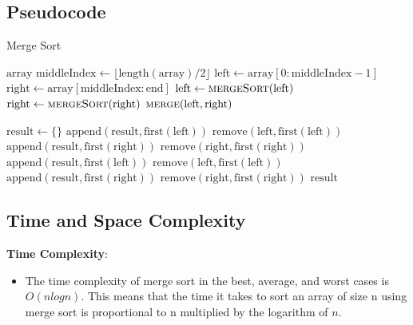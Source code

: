 \documentclass[sigplan,screen]{acmart}
\begin{document}
\subsection{Pseudocode}


\begin{algorithm}[H]
\captionsetup{justification=centering}
\caption{Merge Sort}
\begin{algorithmic}[1]
        \Return $\text{array}$
    \EndIf
    \State $\text{middleIndex} \gets \lfloor \text{length}(\text{array}) / 2 \rfloor$
    \State $\text{left} \gets \text{array}[0:\text{middleIndex}-1]$
    \State $\text{right} \gets \text{array}[\text{middleIndex}:\text{end}]$
    \State $\text{left} \gets \Call{mergeSort}{\text{left}}$
    \State $\text{right} \gets \Call{mergeSort}{\text{right}}$
    \Return $\Call{merge}{\text{left}, \text{right}}$
\EndFunction


    \State $\text{result} \gets \{\}$
            \State $\text{append}(\text{result}, \text{first}(\text{left}))$
            \State $\text{remove}(\text{left}, \text{first}(\text{left}))$
        \Else
            \State $\text{append}(\text{result}, \text{first}(\text{right}))$
            \State $\text{remove}(\text{right}, \text{first}(\text{right}))$
        \EndIf
    \EndWhile
        \State $\text{append}(\text{result}, \text{first}(\text{left}))$
        \State $\text{remove}(\text{left}, \text{first}(\text{left}))$
    \EndWhile
        \State $\text{append}(\text{result}, \text{first}(\text{right}))$
        \State $\text{remove}(\text{right}, \text{first}(\text{right}))$
    \EndWhile
    \Return $\text{result}$
\EndFunction
\end{algorithmic}
\end{algorithm}



\subsection{Time and Space Complexity}


\textbf{Time Complexity}:
\begin{itemize}
    \item The time complexity of merge sort in the best, average, and worst cases is $O(n log n)$. This means that the time it takes to sort an array of size n using merge sort is proportional to n multiplied by the logarithm of $n$. 
\end{itemize}
\end{document}
